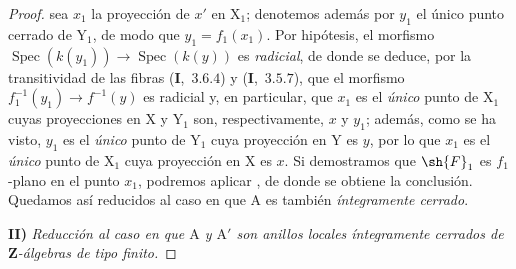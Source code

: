 \begin{proof}
sea $x_1$ la proyección de $x'$ en $\mathrm{X}_1$; denotemos además por $y_1$ el único punto cerrado
de $\mathrm{Y}_1$, de modo que $y_1=f_1(x_1)$. Por hipótesis, el morfismo $\operatorname{Spec}(k(y_1))\to\operatorname{Spec}(k(y))$
es \emph{radicial}, de donde se deduce, por la transitividad de las fibras (\textbf{I},~$3.6.4$) y (\textbf{I},~$3.5.7$), que
el morfismo $f_1^{-1}(y_1)\to f^{-1}(y)$ es radicial y, en particular, que $x_1$ es el \emph{único} punto de $\mathrm{X}_1$
cuyas proyecciones en $\mathrm{X}$ y $\mathrm{Y}_1$ son, respectivamente, $x$ y $y_1$; además, como se ha visto, $y_1$
es el \emph{único} punto de $\mathrm{Y}_1$ cuya proyección en $\mathrm{Y}$ es $y$, por lo que $x_1$ es el \emph{único} punto de $\mathrm{X}_1$
cuya proyección en $\mathrm{X}$ es $x$. Si demostramos que $\sh{F}_1$ es $f_1$-plano en el punto $x_1$, podremos
aplicar , de donde se obtiene la conclusión. Quedamos así reducidos al caso en que $\mathrm{A}$
es también \emph{íntegramente cerrado}.

\medskip
\noindent\textbf{II)} \emph{Reducción al caso en que $\mathrm{A}$ y $\mathrm{A}'$ son anillos locales íntegramente cerrados de $\mathbf{Z}$-álgebras de tipo
finito.}


\end{proof}
